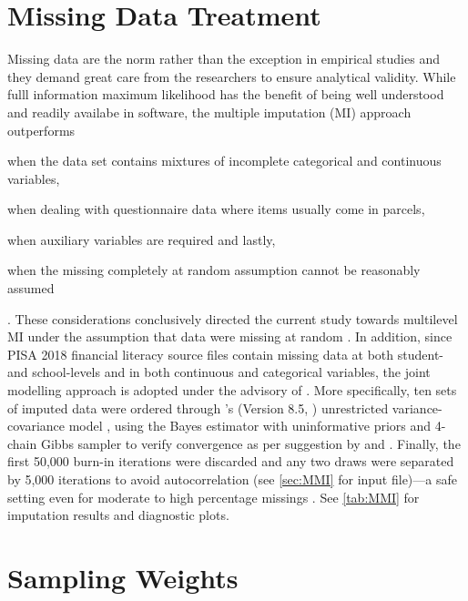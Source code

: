 \documentclass[a4paper,11pt,UKenglish,twoside,openright]{report}\usepackage[]{graphicx}\usepackage[]{color}
\begin{document}


\section{Missing Data Treatment}

Missing data are the norm rather than the exception in empirical studies and they demand great care from the researchers to ensure analytical validity. While fulll information maximum likelihood has the benefit of being well understood and readily availabe in software, the multiple imputation (MI) approach outperforms
\begin{enumerate*}[label={(\alph*)}]
    \item when the data set contains mixtures of incomplete categorical and continuous variables,
    \item when dealing with questionnaire data where items usually come in parcels,
    \item when auxiliary variables are required and lastly,
    \item when the missing completely at random assumption cannot be reasonably assumed
\end{enumerate*}
\parencite{enders:2018}. These considerations conclusively directed the current study towards multilevel MI under the assumption that data were missing at random \parencite{little:2019}. In addition, since PISA 2018 financial literacy source files contain missing data at both student- and school-levels and in both continuous and categorical variables, the joint modelling approach is adopted under the advisory of \textcite{grund:2018}. More specifically, ten sets of imputed data were ordered through \CM's (Version 8.5, \textcite{mplus}) unrestricted variance- covariance model \parencite[``JM-AM H1'',][]{asparouhov:2010b}, using the Bayes estimator with uninformative priors and 4-chain Gibbs sampler to verify convergence as per suggestion by \textcite[][p. 230]{little:2019} and \textcite[][p. 314]{lambert:2018}. Finally, the first 50,000 burn-in iterations were discarded and any two draws were separated by 5,000 iterations to avoid autocorrelation (see \cref{sec:MMI} for input file)---a safe setting even for moderate to high percentage missings \parencite{grund:2016}. See \cref{tab:MMI} for imputation results and diagnostic plots.

\section{Sampling Weights}
\end{document}
